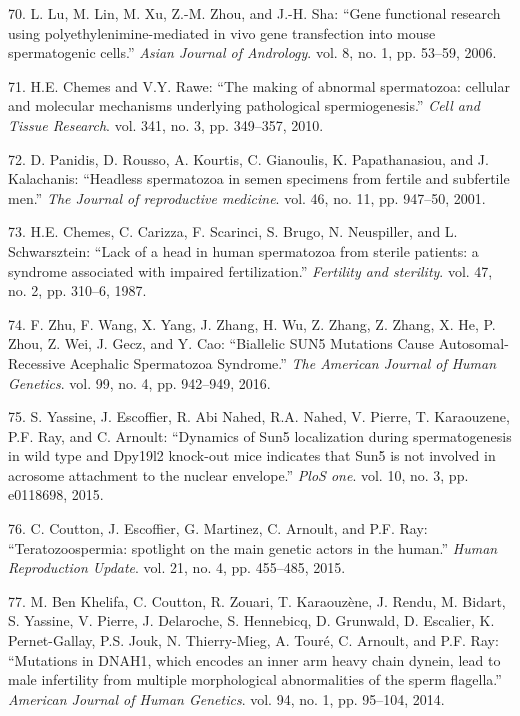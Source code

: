 \documentclass[12pt,twoside]{reedthesis}
\theoremstyle{definition}
\theoremstyle{definition}
\theoremstyle{remark}
\begin{document}
  \hypertarget{ref-Lu2006}{}
  70. L. Lu, M. Lin, M. Xu, Z.-M. Zhou, and J.-H. Sha: ``Gene functional
  research using polyethylenimine-mediated in vivo gene transfection into
  mouse spermatogenic cells.'' \emph{Asian Journal of Andrology}. vol. 8,
  no. 1, pp. 53--59, 2006.
  
  \hypertarget{ref-Chemes2010}{}
  71. H.E. Chemes and V.Y. Rawe: ``The making of abnormal spermatozoa:
  cellular and molecular mechanisms underlying pathological
  spermiogenesis.'' \emph{Cell and Tissue Research}. vol. 341, no. 3, pp.
  349--357, 2010.
  
  \hypertarget{ref-Panidis2001}{}
  72. D. Panidis, D. Rousso, A. Kourtis, C. Gianoulis, K. Papathanasiou,
  and J. Kalachanis: ``Headless spermatozoa in semen specimens from
  fertile and subfertile men.'' \emph{The Journal of reproductive
  medicine}. vol. 46, no. 11, pp. 947--50, 2001.
  
  \hypertarget{ref-Chemes1987}{}
  73. H.E. Chemes, C. Carizza, F. Scarinci, S. Brugo, N. Neuspiller, and
  L. Schwarsztein: ``Lack of a head in human spermatozoa from sterile
  patients: a syndrome associated with impaired fertilization.''
  \emph{Fertility and sterility}. vol. 47, no. 2, pp. 310--6, 1987.
  
  \hypertarget{ref-Zhu2016}{}
  74. F. Zhu, F. Wang, X. Yang, J. Zhang, H. Wu, Z. Zhang, Z. Zhang, X.
  He, P. Zhou, Z. Wei, J. Gecz, and Y. Cao: ``Biallelic SUN5 Mutations
  Cause Autosomal-Recessive Acephalic Spermatozoa Syndrome.'' \emph{The
  American Journal of Human Genetics}. vol. 99, no. 4, pp. 942--949, 2016.
  
  \hypertarget{ref-Yassine2015}{}
  75. S. Yassine, J. Escoffier, R. Abi Nahed, R.A. Nahed, V. Pierre, T.
  Karaouzene, P.F. Ray, and C. Arnoult: ``Dynamics of Sun5 localization
  during spermatogenesis in wild type and Dpy19l2 knock-out mice indicates
  that Sun5 is not involved in acrosome attachment to the nuclear
  envelope.'' \emph{PloS one}. vol. 10, no. 3, pp. e0118698, 2015.
  
  \hypertarget{ref-Coutton2015}{}
  76. C. Coutton, J. Escoffier, G. Martinez, C. Arnoult, and P.F. Ray:
  ``Teratozoospermia: spotlight on the main genetic actors in the human.''
  \emph{Human Reproduction Update}. vol. 21, no. 4, pp. 455--485, 2015.
  
  \hypertarget{ref-BenKhelifa2014}{}
  77. M. Ben Khelifa, C. Coutton, R. Zouari, T. Karaouzène, J. Rendu, M.
  Bidart, S. Yassine, V. Pierre, J. Delaroche, S. Hennebicq, D. Grunwald,
  D. Escalier, K. Pernet-Gallay, P.S. Jouk, N. Thierry-Mieg, A. Touré, C.
  Arnoult, and P.F. Ray: ``Mutations in DNAH1, which encodes an inner arm
  heavy chain dynein, lead to male infertility from multiple morphological
  abnormalities of the sperm flagella.'' \emph{American Journal of Human
  Genetics}. vol. 94, no. 1, pp. 95--104, 2014.
  
\end{document}
